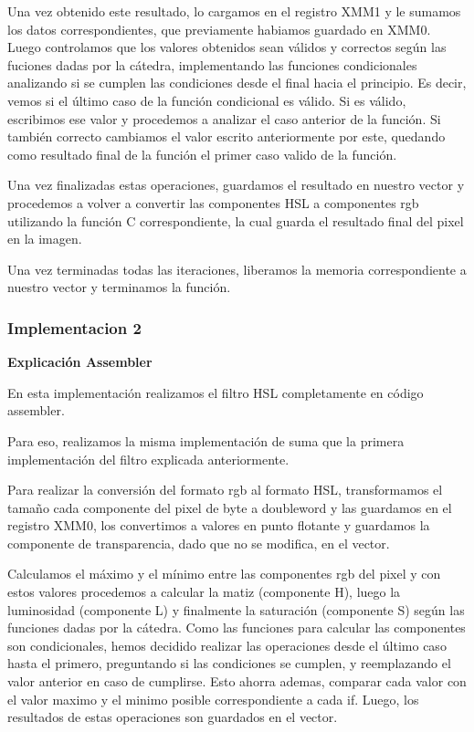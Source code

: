 Una vez obtenido este resultado, lo cargamos en el registro XMM1 y le sumamos los datos correspondientes, que previamente habiamos guardado en XMM0. Luego controlamos que los valores obtenidos sean válidos y correctos según las fuciones dadas por la cátedra, implementando las funciones condicionales analizando si se cumplen las condiciones desde el final hacia el principio. Es decir, vemos si el último caso de la función condicional es válido. Si es válido, escribimos ese valor y procedemos a analizar el caso anterior de la función. Si también correcto cambiamos el valor escrito anteriormente por este, quedando como resultado final de la función el primer caso valido de la función.

Una vez finalizadas estas operaciones, guardamos el resultado en nuestro vector y procedemos a volver a convertir las componentes HSL a componentes rgb utilizando la función C correspondiente, la cual guarda el resultado final del pixel en la imagen.

Una vez terminadas todas las iteraciones, liberamos la memoria correspondiente a nuestro vector y terminamos la función.

\newpage

\subsubsection{Implementacion 2}

\textbf{Explicación Assembler}

En esta implementación realizamos el filtro HSL completamente en código assembler.

Para eso, realizamos la misma implementación de suma que la primera implementación del filtro explicada anteriormente.

Para realizar la conversión del formato rgb al formato HSL, transformamos el tamaño cada componente del pixel de byte a doubleword y las guardamos en el registro XMM0, los convertimos a valores en punto flotante y guardamos la componente de transparencia, dado que no se modifica, en el vector.

Calculamos el máximo y el mínimo entre las componentes rgb del pixel y con estos valores procedemos a calcular la matiz (componente H), luego la luminosidad (componente L) y finalmente la saturación (componente S) según las funciones dadas por la cátedra. Como las funciones para calcular las componentes son condicionales, hemos decidido realizar las operaciones desde el último caso hasta el primero, preguntando si las condiciones se cumplen, y reemplazando el valor anterior en caso de cumplirse. Esto ahorra ademas, comparar cada valor con el valor maximo y el minimo posible correspondiente a cada if. Luego, los resultados de estas operaciones son guardados en el vector.

